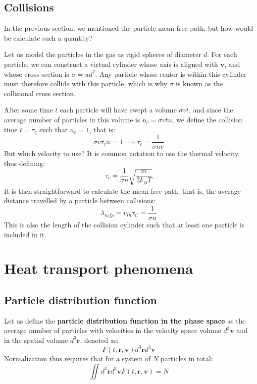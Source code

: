 \documentclass[a4paper,11pt,oneside]{book}
\newcommand{\BF}[1]{\boldsymbol{#1}}
\begin{document}
\section{Collisions}
In the previous section, we mentioned the particle mean free path, but how would be calculate such a quantity?


Let us model the particles in the gas as rigid spheres of diameter $d$. For each particle, we can construct a virtual cylinder whose axis is aligned with $\BF{v}$, and whose cross section is $\sigma=\pi d^2$. Any particle whose center is within this cylinder must therefore collide with this particle, which is why $\sigma$ is known as the collisional cross section. 


After some time $t$ each particle will have swept a volume $\sigma vt$, and since the average number of particles in this volume is $n_c=\sigma v t n$, we define the collision time $t=\tau_c$ such that $n_c=1$, that is:
\begin{equation}
    \sigma v \tau_c n = 1 \implies \tau_c = \frac{1}{\sigma n v}
\end{equation}
But which velocity to use? It is common notation to use the thermal velocity, thus defining:
\begin{equation}
    \boxed{\tau_c = \frac{1}{\sigma n}\sqrt{\frac{m}{2k_BT}}}
\end{equation}
It is then straightforward to calculate the mean free path, that is, the average distance travelled by a particle between collisions:
\begin{equation}
    \boxed{\lambda_{mfp} = v_{th}\tau_C = \frac{1}{\sigma n}}
\end{equation}
This is also the length of the collision cylinder such that at least one particle is included in it.


\chapter{Heat transport phenomena}
\section{Particle distribution function}
Let us define the \textbf{particle distribution function in the phase space} as the average number of particles with velocities in the velocity space volume $d^3 \BF{v}$ and in the spatial volume $d^3 \BF{r}$, denoted as:
\begin{equation}
    F(t,\BF{r},\BF{v}) d^3 \BF{r} d^3 \BF{v}
\end{equation}
Normalization thus requires that for a system of $N$ particles in total:
\begin{equation}
    \iint d^3 \BF{r} d^3 \BF{v}  F(t,\BF{r},\BF{v}) = N
\end{equation}
\end{document}
